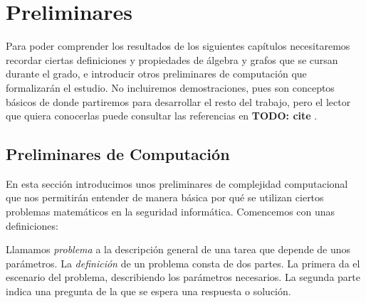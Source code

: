 \chapter{Preliminares}\label{ch:preliminares}


Para poder comprender los resultados de los siguientes capítulos necesitaremos recordar ciertas definiciones y propiedades de álgebra y grafos que se cursan durante el grado, e introducir otros preliminares de computación que formalizarán el estudio. No incluiremos demostraciones, pues son conceptos básicos de donde partiremos para desarrollar el resto del trabajo, pero el lector que quiera conocerlas puede consultar las referencias en \textbf{TODO: cite} \citep{gruposYanillos}.

\section{Preliminares de Computación}





En esta sección introducimos unos preliminares de complejidad computacional que nos permitirán entender de manera básica por qué se utilizan ciertos problemas matemáticos en la seguridad informática. Comencemos con unas definiciones:

\begin{definition}
	Llamamos \textit{problema} a la descripción general de una tarea que depende de unos parámetros. La \textit{definición} de un problema consta de dos partes. La primera da el escenario del problema, describiendo los parámetros necesarios. La segunda parte indica una pregunta de la que se espera una respuesta o solución.
\end{definition}

